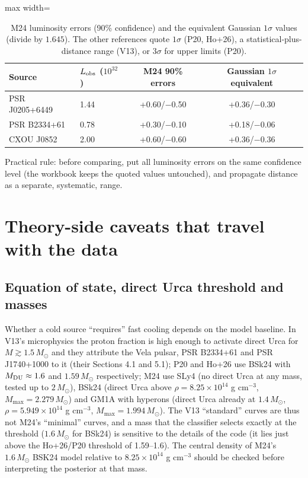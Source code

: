 \documentclass[11pt,a4paper]{article}
\begin{document}
\begin{table}[htbp]
\centering\small
\caption{M24 luminosity errors (90\% confidence) and the equivalent Gaussian $1\sigma$ values (divide by $1.645$). The other references quote $1\sigma$ (P20, Ho+26), a statistical-plus-distance range (V13), or $3\sigma$ for upper limits (P20).}\label{tab:conf}
\begin{adjustbox}{max width=\textwidth}\begin{tabular}{llcc}
\toprule
Source & $L_{\rm obs}$ ($10^{32}$) & M24 90\% errors & Gaussian $1\sigma$ equivalent\\
\midrule
PSR J0205+6449 & 1.44 & +0.60/$-$0.50 & +0.36/$-$0.30\\
PSR B2334+61 & 0.78 & +0.30/$-$0.10 & +0.18/$-$0.06\\
CXOU J0852 & 2.00 & +0.60/$-$0.60 & +0.36/$-$0.36\\
\bottomrule
\end{tabular}\end{adjustbox}
\end{table}


Practical rule: before comparing, put all luminosity errors on the same confidence level (the workbook keeps the quoted values untouched), and propagate distance as a separate, systematic, range.

\section{Theory-side caveats that travel with the data}
\subsection{Equation of state, direct Urca threshold and masses}
Whether a cold source ``requires'' fast cooling depends on the model baseline. In V13's microphysics the proton fraction is high enough to activate direct Urca for $M\gtrsim1.5\,M_\odot$ and they attribute the Vela pulsar, PSR B2334+61 and PSR J1740+1000 to it (their Sections 4.1 and 5.1); P20 and Ho+26 use BSk24 with $M_{\rm DU}\approx1.6$ and $1.59\,M_\odot$ respectively; M24 use SLy4 (no direct Urca at any mass, tested up to $2\,M_\odot$), BSk24 (direct Urca above $\rho=8.25\times10^{14}$ g cm$^{-3}$, $M_{\max}=2.279\,M_\odot$) and GM1A with hyperons (direct Urca already at $1.4\,M_\odot$, $\rho=5.949\times10^{14}$ g cm$^{-3}$, $M_{\max}=1.994\,M_\odot$). The V13 ``standard'' curves are thus not M24's ``minimal'' curves, and a mass that the classifier selects exactly at the threshold ($1.6\,M_\odot$ for BSk24) is sensitive to the details of the code (it lies just above the Ho+26/P20 threshold of 1.59--1.6). The central density of M24's $1.6\,M_\odot$ BSK24 model relative to $8.25\times10^{14}$ g cm$^{-3}$ should be checked before interpreting the posterior at that mass.
\end{document}

